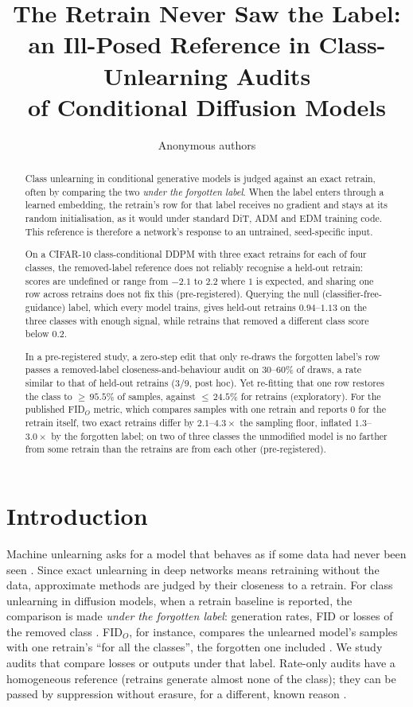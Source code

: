 \documentclass[10pt]{article}
\title{The Retrain Never Saw the Label:\\an Ill-Posed Reference in Class-Unlearning Audits\\of Conditional Diffusion Models}
\author{Anonymous authors}
\date{}
\begin{document}
\maketitle

\begin{abstract}
Class unlearning in conditional generative models is judged against an exact retrain, often by comparing the two \emph{under the forgotten label}. When the label enters through a learned embedding, the retrain's row for that label receives no gradient and stays at its random initialisation, as it would under standard DiT, ADM and EDM training code. This reference is therefore a network's response to an untrained, seed-specific input.

On a CIFAR-10 class-conditional DDPM with three exact retrains for each of four classes, the removed-label reference does not reliably recognise a held-out retrain: scores are undefined or range from $-2.1$ to $2.2$ where $1$ is expected, and sharing one row across retrains does not fix this (pre-registered). Querying the null (classifier-free-guidance) label, which every model trains, gives held-out retrains $0.94$--$1.13$ on the three classes with enough signal, while retrains that removed a different class score below $0.2$.

In a pre-registered study, a zero-step edit that only re-draws the forgotten label's row passes a removed-label closeness-and-behaviour audit on 30--60\% of draws, a rate similar to that of held-out retrains (3/9, post hoc). Yet re-fitting that one row restores the class to ${\geq}\,95.5\%$ of samples, against ${\leq}\,24.5\%$ for retrains (exploratory). For the published FID$_O$ metric, which compares samples with one retrain and reports $0$ for the retrain itself, two exact retrains differ by $2.1$--$4.3\times$ the sampling floor, inflated $1.3$--$3.0\times$ by the forgotten label; on two of three classes the unmodified model is no farther from some retrain than the retrains are from each other (pre-registered).
\end{abstract}

\section{Introduction}
Machine unlearning asks for a model that behaves as if some data had never been seen \citep{cao2015,bourtoule2021}. Since exact unlearning in deep networks means retraining without the data, approximate methods are judged by their closeness to a retrain. For class unlearning in diffusion models, when a retrain baseline is reported, the comparison is made \emph{under the forgotten label}: generation rates, FID or losses of the removed class \citep{fan2024salun,chen2025sfd,zheng2026tai}. FID$_O$, for instance, compares the unlearned model's samples with one retrain's ``for all the classes'', the forgotten one included \citep{zheng2026tai}. We study audits that compare losses or outputs under that label. Rate-only audits have a homogeneous reference (retrains generate almost none of the class); they can be passed by suppression without erasure, for a different, known reason \citep{pham2023,zhang2024attack}.
\end{document}
